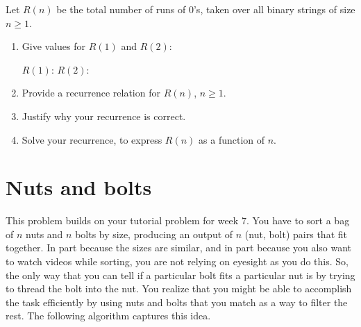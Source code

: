 \documentclass[11pt]{article}
\newcommand{\fillinblanksoln}[1]{\fillinblankmathsoln{\mbox{#1}}}
\newcommand{\fillinblankmathsoln}[1]{\begingroup\setlength{\fboxsep}{1em}\setlength{\fboxrule}{2pt}\fbox{{#1}}\endgroup}
\def\question#1{\red{#1}}
\def\red#1{{\color{red}#1}}
\begin{document}
Let $R(n)$ be the total number of runs of 0's, taken over all binary
strings of size $n \ge 1$.

\begin{enumerate}
\item \question{Give values for $R(1)$ and $R(2)$}:

\hspace{.5in}
$R(1)$: \fillinblanksoln{1}
\hspace{.5in}
$R(2)$: \fillinblanksoln{3}

\item \question{Provide a recurrence relation for $R(n)$, $n \ge 1$.}

\item \question{Justify why your recurrence is correct.}

\item \question{Solve your recurrence, to express $R(n)$ as a function of $n$.}
\end{enumerate}
\section{Nuts and bolts}
\label{sec-4}
This problem builds on your tutorial problem for week 7. 
You have to sort a bag of $n$ nuts and $n$ bolts by size, producing an
output of $n$ (nut, bolt) pairs that fit together.  In part because
the sizes are similar, and in part because you also want to watch
videos while sorting, you are not relying on eyesight as you do
this. So, the only way that you can tell if a particular bolt fits a
particular nut is by trying to thread the bolt into the nut.  
You realize that you might be able to accomplish the task
efficiently by using nuts and bolts that you match as a way to
filter the rest. The following algorithm captures this idea.
\end{document}
